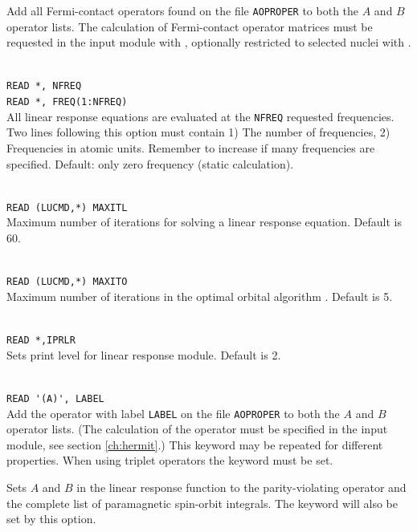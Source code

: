 \begin{description}
\item{}
Add all Fermi-contact operators
found on the file \verb|AOPROPER| to both the $A$ and $B$ operator lists.
The calculation of Fermi-contact operator matrices must be requested in the  input module with ,
optionally restricted to selected nuclei with .

\item{}\\
\verb|READ *, NFREQ|\\
\verb|READ *, FREQ(1:NFREQ)|\\
All linear response equations are evaluated at the \verb|NFREQ| requested
frequencies.
Two lines following
this option must contain 1) The number of frequencies, 2) Frequencies
in atomic units.
Remember to increase  if many frequencies are specified.
Default: only zero frequency (static calculation).

\item{}\\
\verb|READ (LUCMD,*) MAXITL|\\
Maximum number of iterations for solving a linear response
equation. Default is 60.

\item{}\\
\verb|READ (LUCMD,*) MAXITO|\\
Maximum number of iterations in the optimal orbital
algorithm
\cite{tuhjahjajpjjcp84}.
Default is 5.

\item{}\\
\verb|READ *,IPRLR|\\
Sets print level for linear response module. Default is 2.

\item{}\\
\verb|READ '(A)', LABEL|\\
Add the operator with label \verb|LABEL| 
on the file \verb|AOPROPER| to both the $A$ and $B$ operator lists.
(The calculation of the operator must be specified in the  input module,
see section \ref{ch:hermit}.)
This keyword may be repeated for different properties.
When using triplet operators the  keyword 
must be set.

\item{} Sets $A$ and $B$ in the linear response function
  to the parity-violating operator and the complete list of
  paramagnetic spin-orbit integrals. The  keyword will
  also be set by this option.


\end{description}
